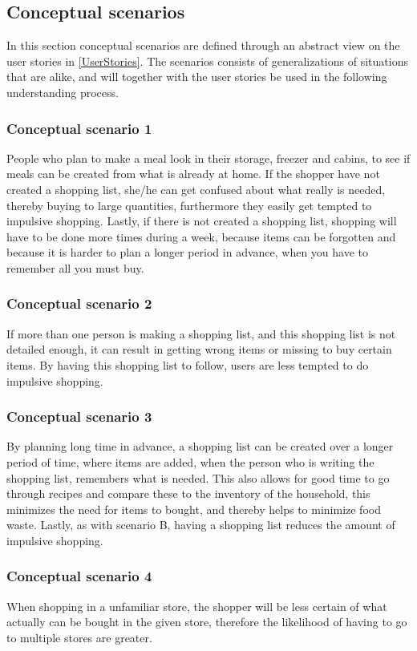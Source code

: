 \subsection{Conceptual scenarios} \label{conceptualScenarios}
In this section conceptual scenarios are defined through an abstract view on the user stories in \cref{UserStories}. The scenarios consists of generalizations of situations that are alike, and will together with the user stories be used in the following understanding process.

\subsubsection{Conceptual scenario 1}
People who plan to make a meal look in their storage, freezer and cabins, to see if meals can be created from what is already at home. If the shopper have not created a shopping list, she/he can get confused about what really is needed, thereby buying to large quantities, furthermore they easily get tempted to impulsive shopping. Lastly, if there is not created a shopping list, shopping will have to be done more times during a week, because items can be forgotten and because it is harder to plan a longer period in advance, when you have to remember all you must buy.

\subsubsection{Conceptual scenario 2}
If more than one person is making a shopping list, and this shopping list is not detailed enough, it can result in getting wrong items or missing to buy certain items. By having this shopping list to follow, users are less tempted to do impulsive shopping.

\subsubsection{Conceptual scenario 3}
By planning long time in advance, a shopping list can be created over a longer period of time, where items are added, when the person who is writing the shopping list, remembers what is needed. This also allows for good time to go through recipes and compare these to the inventory of the household, this minimizes the need for items to bought, and thereby helps to minimize food waste. Lastly, as with scenario B, having a shopping list reduces the amount of impulsive shopping.

\subsubsection{Conceptual scenario 4}
When shopping in a unfamiliar store, the shopper will be less certain of what actually can be bought in the given store, therefore the likelihood of having to go to multiple stores are greater.